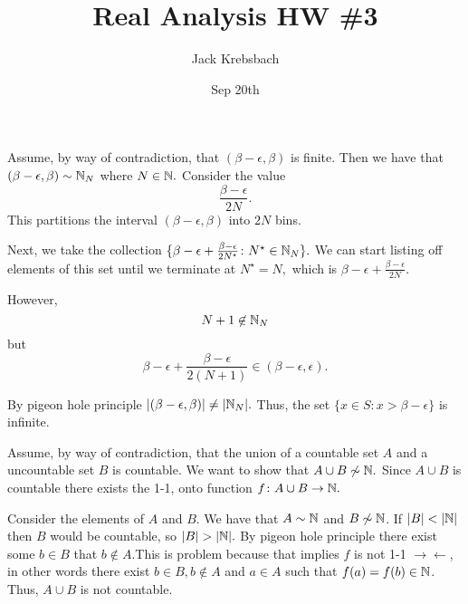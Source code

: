 \documentclass{report}
\title{Real Analysis HW \#3}
\author{Jack Krebsbach }
\date{Sep 20th}
\begin{document}
\maketitle


\sol
\begin{myproof}
    
Assume, by way of contradiction, that $(\beta - \epsilon, \beta)$ is finite. Then we have that $(\beta - \epsilon,\beta) \sim \NN_{N}$ where $N \in \NN.$ Consider the value $$\frac{\beta - \epsilon}{2N}.$$ This partitions the interval $(\beta - \epsilon, \beta)$ into $2N$ bins. 

Next, we take the collection $\{ \beta - \epsilon + \frac{\beta - \epsilon}{2N^\star}  \colon  N^\star \in \NN_N\}.$ We can start listing off elements of this set until we terminate at $N^\star = N,$ which is $ \beta - \epsilon + \frac{\beta-\epsilon}{2N}$.\par However, $$N + 1 \not\in \NN_N$$ but 
$$ \beta - \epsilon + \frac{\beta - \epsilon}{2(N+1)} \in (\beta - \epsilon, \epsilon).$$

By pigeon hole principle $|(\beta-\epsilon, \beta)| \neq |\NN_N|.$ Thus, the set $\{x \in S: x>\beta-\epsilon\}$ is infinite.

\end{myproof}
\begin{myproof}
  Assume, by way of contradiction, that the union of a countable set $A$ and a uncountable set $B$ is countable. We want to show that $A \cup B \not\sim \NN.$ Since $A \cup B$ is countable there exists the 1-1, onto function $f\colon  A \cup B \rightarrow \NN.$

Consider the elements of $A$ and $B$. We have that $A \sim \NN$ and $B \not\sim \NN$. If $|B| < |\NN|$ then $B$ would be countable, so $|B| > |\NN|.$ By pigeon hole principle there exist some $b \in B$ that $b \not \in A.$This is problem because that implies $f$ is not 1-1 $\rightarrow\!\leftarrow$, in other words there exist $b \in B, b\not\in A$ and $a \in A$ such that $f(a)=f(b) \in \NN$. Thus, $A \cup B$ is not countable.
  
\end{myproof}
\end{document}
